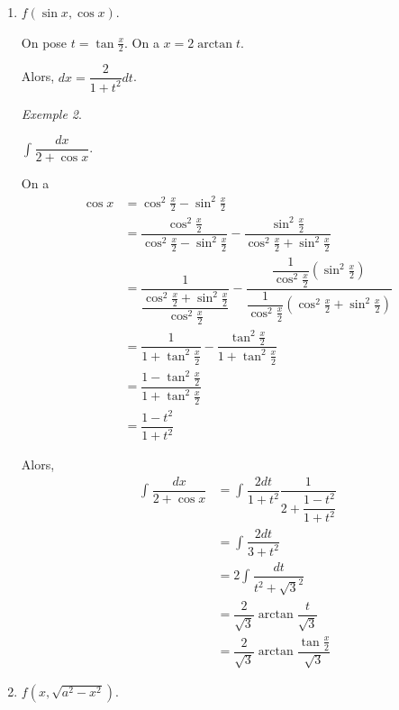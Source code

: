 \documentclass{report}
\newcommand*{\dint}[3]{\displaystyle\int_{#1}^{#2}#3}
\theoremstyle{definition}
\theoremstyle{remark}
\newtheorem*{exem}{Exemple}
\begin{document}
\begin{enumerate}
\begin{exem}
			Alors, $dt = (-1) (u^2-1)^{-2} (2u) du$.

			Ainsi,
			\begin{align*}
				\dfrac{1}{2} \dint{}{}{t^{-3} \left( \dfrac{1+t}{t} \right)^{\sfrac{-1}{2}} dt}&= -\dfrac{1}{2} \dint{}{}{(u^2-1)^3 u^{-1} (u^2-1)^{-2} 2udu}\\
				&= -\dint{}{}{(u^2-1) du}
			\end{align*}
		\end{exem}
		\item $f(\sin x, \cos x)$.

		On pose $t=\tan\frac{x}{2}$. On a $x=2 \arctan t$.

		Alors, $dx = \dfrac{2}{1+t^2} dt$.
		\begin{exem}~

			$\dint{}{}{\dfrac{dx}{2+\cos x}}$.

			On a
			\begin{align*}
				\cos x&= \cos^2\frac{x}{2} - \sin^2\frac{x}{2}\\
				&= \dfrac{\cos^2\frac{x}{2}} {\cos^2\frac{x}{2} - \sin^2\frac{x}{2}} - \dfrac{\sin^2\frac{x}{2}} {\cos^2\frac{x}{2} + \sin^2\frac{x}{2}}\\
				&= \dfrac{1}{\dfrac{\cos^2\frac{x}{2} + \sin^2\frac{x}{2}}{\cos^2\frac{x}{2}}} - \dfrac{\dfrac{1}{\cos^2\frac{x}{2}}\left(\sin^2\frac{x}{2}\right)} {\dfrac{1}{\cos^2\frac{x}{2}} \left(\cos^2\frac{x}{2} + \sin^2\frac{x}{2}\right)}\\
				&= \dfrac{1}{1 + \tan^2 \frac{x}{2}} - \dfrac{\tan^2 \frac{x}{2}} {1 + \tan^2 \frac{x}{2}}\\
				&= \dfrac{1 - \tan^2 \frac{x}{2}}{1 + \tan^2 \frac{x}{2}}\\
				&= \dfrac{1-t^2}{1+t^2}
			\end{align*}

			Alors,
			\begin{align*}
				\dint{}{}{\dfrac{dx}{2+\cos x}}&= \dint{}{}{\dfrac{2dt}{1+t^2} \dfrac{1}{2 + \dfrac{1 - t^2}{1 + t^2}}}\\
				&= \dint{}{}{\dfrac{2dt}{3+t^2}}\\
				&= 2\dint{}{}{\dfrac{dt}{t^2+\sqrt{3}^2}}\\
				&= \dfrac{2}{\sqrt{3}} \arctan\dfrac{t}{\sqrt{3}}\\
				&= \dfrac{2}{\sqrt{3}} \arctan \dfrac{\tan \frac{x}{2}}{\sqrt{3}}
			\end{align*}
		\end{exem}
		\item $f\left( x,\sqrt{a^2-x^2} \right)$.


\end{enumerate}
\end{document}
